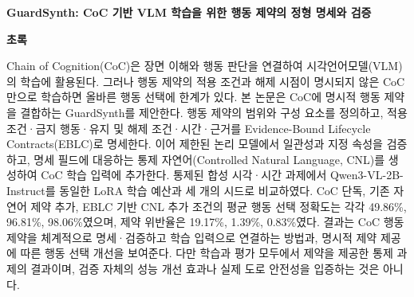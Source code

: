 \documentclass[11pt,a4paper]{article}
\begin{document}
\vspace*{8mm}
{\Large\bfseries\color{navy} GuardSynth: CoC 기반 VLM 학습을 위한 행동 제약의 정형 명세와 검증\par}
\vspace{8mm}
{\large\bfseries 초록\par}
\vspace{3mm}
Chain of Cognition(CoC)은 장면 이해와 행동 판단을 연결하여 시각언어모델(VLM)의 학습에 활용된다. 그러나 행동 제약의 적용 조건과 해제 시점이 명시되지 않은 CoC만으로 학습하면 올바른 행동 선택에 한계가 있다. 본 논문은 CoC에 명시적 행동 제약을 결합하는 GuardSynth를 제안한다. 행동 제약의 범위와 구성 요소를 정의하고, 적용 조건·금지 행동·유지 및 해제 조건·시간·근거를 Evidence-Bound Lifecycle Contracts(EBLC)로 명세한다. 이어 제한된 논리 모델에서 일관성과 지정 속성을 검증하고, 명세 필드에 대응하는 통제 자연어(Controlled Natural Language, CNL)를 생성하여 CoC 학습 입력에 추가한다. 통제된 합성 시각·시간 과제에서 Qwen3-VL-2B-Instruct를 동일한 LoRA 학습 예산과 세 개의 시드로 비교하였다. CoC 단독, 기존 자연어 제약 추가, EBLC 기반 CNL 추가 조건의 평균 행동 선택 정확도는 각각 49.86\%, 96.81\%, 98.06\%였으며, 제약 위반율은 19.17\%, 1.39\%, 0.83\%였다. 결과는 CoC 행동 제약을 체계적으로 명세·검증하고 학습 입력으로 연결하는 방법과, 명시적 제약 제공에 따른 행동 선택 개선을 보여준다. 다만 학습과 평가 모두에서 제약을 제공한 통제 과제의 결과이며, 검증 자체의 성능 개선 효과나 실제 도로 안전성을 입증하는 것은 아니다.
\end{document}

